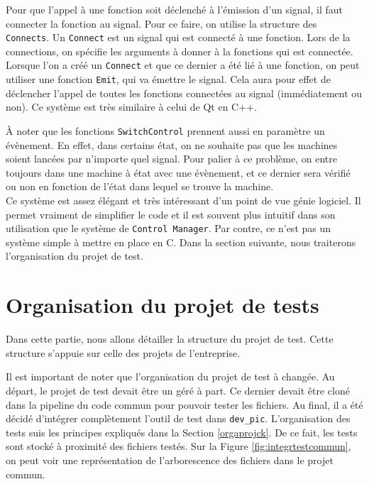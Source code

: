 \documentclass[a4paper]{article}
\begin{document}
Pour que l'appel à une fonction soit déclenché à l'émission d'un signal, il faut
connecter la fonction au signal. Pour ce faire, on utilise la structure des
\verb|Connects|. Un \verb|Connect| est un signal qui est connecté à une
fonction. Lors de la connections, on spécifie les arguments à donner à la
fonctions qui est connectée. Lorsque l'on a créé un \verb|Connect| et que ce
dernier a été lié à une fonction, on peut utiliser une fonction \verb|Emit|, qui
va émettre le signal. Cela aura pour effet de déclencher l'appel de toutes les
fonctions connectées au signal (immédiatement ou non). Ce système est très
similaire à celui de Qt en C++.

À noter que les fonctions \verb|SwitchControl| prennent aussi en paramètre un
évènement. En effet, dans certains état, on ne souhaite pas que les machines
soient lancées par n'importe quel signal. Pour palier à ce problème, on entre
toujours dans une machine à état avec une évènement, et ce dernier sera vérifié
ou non en fonction de l'état dans lequel se trouve la machine.\\

Ce système est assez élégant et très intéressant d'un point de vue génie
logiciel. Il permet vraiment de simplifier le code et il est souvent plus
intuitif dans son utilisation que le système de \verb|Control Manager|. Par
contre, ce n'est pas un système simple à mettre en place en C. Dans la section
suivante, nous traiterons l'organisation du projet de test.
\section{Organisation du projet de tests}%

Dans cette partie, nous allons détailler la structure du projet de test. Cette
structure s'appuie sur celle des projets de l'entreprise.

Il est important de noter que l'organisation du projet de test à changée. Au
départ, le projet de test devait être un géré à part. Ce dernier devait être
cloné dans la pipeline du code commun pour pouvoir tester les fichiers. Au
final, il a été décidé d'intégrer complètement l'outil de test dans
\verb|dev_pic|. L'organisation des tests suis les principes expliqués dans la
Section \ref{orgaprojck}. De ce fait, les tests sont stocké à proximité des
fichiers testés. Sur la Figure \ref{fig:integrtestcommun}, on peut voir une
représentation de l'arborescence des fichiers dans le projet commun.

\end{document}
